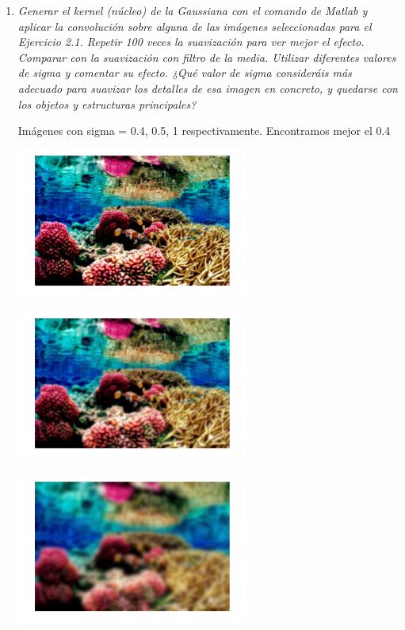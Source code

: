 \documentclass{article}
\begin{document}
\begin{enumerate}
 \begin{enumerate}
 \item \textit{  Generar  el  kernel  (núcleo)  de  la  Gaussiana  con  el  comando  de  Matlab  y  aplicar  la 
convolución  sobre alguna  de las imágenes seleccionadas para el Ejercicio  2.1.  Repetir 
100 veces la suavización para ver mejor el efecto. Comparar con la suavización con filtro 
de  la  media. Utilizar  diferentes  valores  de  sigma  y  comentar  su  efecto.  ¿Qué  valor  de 
sigma consideráis más adecuado para suavizar los detalles de esa imagen en concreto, y 
quedarse con los objetos y estructuras principales?}

  Imágenes con sigma = 0.4, 0.5, 1 respectivamente. Encontramos mejor el 0.4
  
 \begin{center}
 \includegraphics[width=0.6\textwidth]{2a(gaussian_04).png}
 \end{center}
 
 \begin{center}
 \includegraphics[width=0.6\textwidth]{2a(gaussian_05).png}
 \end{center}
 
 \begin{center}
 \includegraphics[width=0.6\textwidth]{2a(gaussian_1).png}
 \end{center} 


\end{enumerate}
\end{enumerate}
\end{document}
